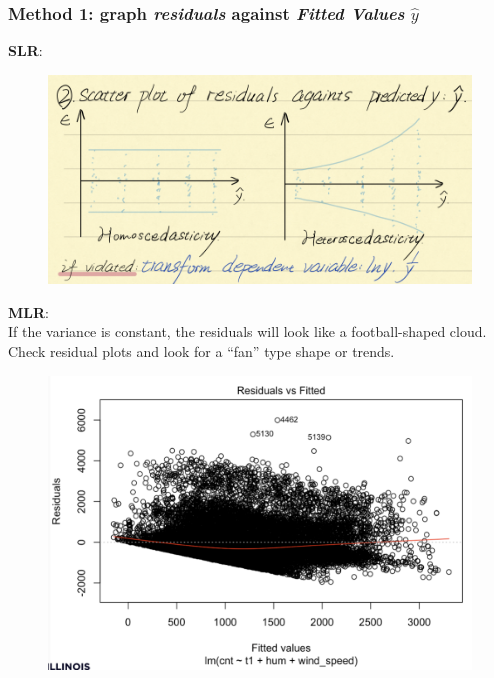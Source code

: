 \documentclass[11pt,a4paper]{article}
\begin{document}
\subsubsection{Method 1: graph \textit{residuals} against \textit{Fitted Values} $\hat{y}$}
\textbf{SLR}:
\begin{center}\begin{figure}[htbp]
    \centering
    \includegraphics[scale=0.7]{check1.png}
    \caption{}
    \label{}
\end{figure}\end{center}
\textbf{MLR}:\\
If the variance is constant, the residuals will look like a football-shaped cloud. Check residual plots and look for a “fan” type shape or trends.\\
\begin{center}\begin{figure}[htbp]
    \centering
    \includegraphics[scale=0.5]{check5}
    \caption{}
    \label{}
\end{figure}\end{center}
\end{document}
